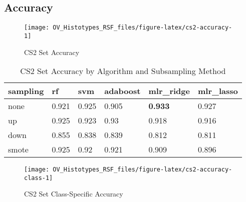 \documentclass[
]{report}
\begin{document}
\hypertarget{accuracy-2}{%
\subsection{Accuracy}\label{accuracy-2}}

\begin{figure}[H]

{\centering \texttt{[image: OV\_Histotypes\_RSF\_files/figure-latex/cs2-accuracy-1]} 

}

\caption{CS2 Set Accuracy}\label{fig:cs2-accuracy}
\end{figure}

\begin{table}

\caption{\label{tab:cs2-accuracy-table}CS2 Set Accuracy by Algorithm and Subsampling Method}
\centering
\begin{tabular}[t]{l|l|l|l|l|l}
\hline
sampling & rf & svm & adaboost & mlr\_ridge & mlr\_lasso\\
\hline
none & 0.921 & 0.925 & 0.905 & \textbf{0.933} & 0.927\\
\hline
up & 0.925 & 0.923 & 0.93 & 0.918 & 0.916\\
\hline
down & 0.855 & 0.838 & 0.839 & 0.812 & 0.811\\
\hline
smote & 0.925 & 0.92 & 0.921 & 0.909 & 0.896\\
\hline
\end{tabular}
\end{table}

\begin{figure}[H]

{\centering \texttt{[image: OV\_Histotypes\_RSF\_files/figure-latex/cs2-accuracy-class-1]} 

}

\caption{CS2 Set Class-Specific Accuracy}\label{fig:cs2-accuracy-class}
\end{figure}
\end{document}
